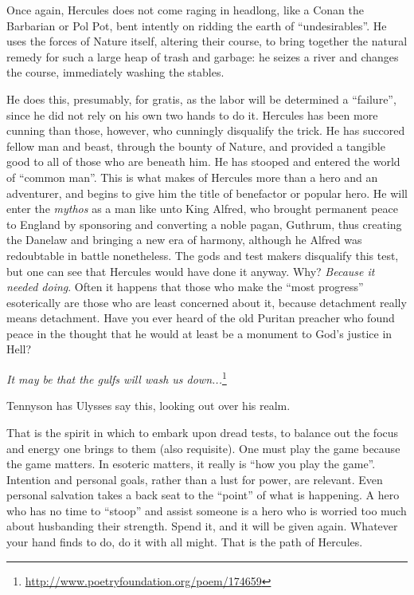 Once again, Hercules does not come raging in headlong, like a Conan the Barbarian or Pol Pot, bent intently on ridding the earth of ``undesirables''. He uses the forces of Nature itself, altering their course, to bring together the natural remedy for such a large heap of trash and garbage: he seizes a river and changes the course, immediately washing the stables.

He does this, presumably, for gratis, as the labor will be determined a ``failure'', since he did not rely on his own two hands to do it. Hercules has been more cunning than those, however, who cunningly disqualify the trick. He has succored fellow man and beast, through the bounty of Nature, and provided a tangible good to all of those who are beneath him. He has stooped and entered the world of ``common man''. This is what makes of Hercules more than a hero and an adventurer, and begins to give him the title of benefactor or popular hero. He will enter the \emph{mythos} as a man like unto King Alfred, who brought permanent peace to England by sponsoring and converting a noble pagan, Guthrum, thus creating the Danelaw and bringing a new era of harmony, although he Alfred was redoubtable in battle nonetheless. The gods and test makers disqualify this test, but one can see that Hercules would have done it anyway. Why? \emph{Because it needed doing}. Often it happens that those who make the ``most progress'' esoterically are those who are least concerned about it, because detachment really means detachment. Have you ever heard of the old Puritan preacher who found peace in the thought that he would at least be a monument to God's justice in Hell?

\emph{It may be that the gulfs will wash us down...}\footnote{\url{http://www.poetryfoundation.org/poem/174659}}

Tennyson has Ulysses say this, looking out over his realm.

That is the spirit in which to embark upon dread tests, to balance out the focus and energy one brings to them (also requisite). One must play the game because the game matters. In esoteric matters, it really is ``how you play the game''. Intention and personal goals, rather than a lust for power, are relevant. Even personal salvation takes a back seat to the ``point'' of what is happening. A hero who has no time to ``stoop'' and assist someone is a hero who is worried too much about husbanding their strength. Spend it, and it will be given again. Whatever your hand finds to do, do it with all might. That is the path of Hercules.

